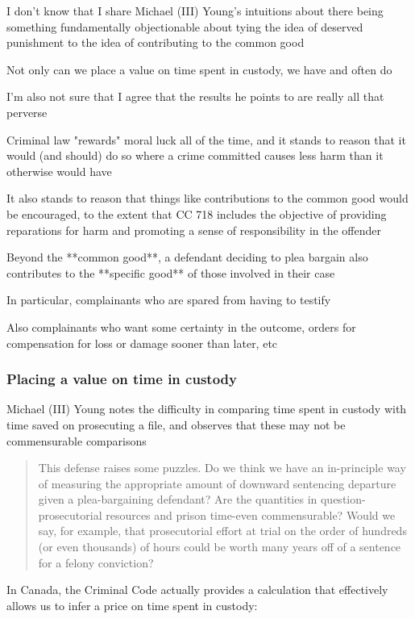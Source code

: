I don't know that I share Michael (III) Young's intuitions about there being something fundamentally objectionable about tying the idea of deserved punishment to the idea of contributing to the common good

Not only can we place a value on time spent in custody, we have and often do

I'm also not sure that I agree that the results he points to are really all that perverse

Criminal law "rewards" moral luck all of the time, and it stands to reason that it would (and should) do so where a crime committed causes less harm than it otherwise would have

It also stands to reason that things like contributions to the common good would be encouraged, to the extent that CC 718 includes the objective of providing reparations for harm and promoting a sense of responsibility in the offender

Beyond the **common good**, a defendant deciding to plea bargain also contributes to the **specific good** of those involved in their case

In particular, complainants who are spared from having to testify

Also complainants who want some certainty in the outcome, orders for compensation for loss or damage sooner than later, etc

\subsubsection{Placing a value on time in custody}

Michael (III) Young notes the difficulty in comparing time spent in custody with time saved on prosecuting a file, and observes that these may not be commensurable comparisons

\begin{quote}
    This defense raises some puzzles. Do we think we have an in-principle way of measuring the appropriate amount of downward sentencing departure given a plea-bargaining defendant? Are the quantities in question-prosecutorial resources and prison time-even commensurable? Would we say, for example, that prosecutorial effort at trial on the order of hundreds (or even thousands) of hours could be worth many years off of a sentence for a felony conviction?
\end{quote}

In Canada, the Criminal Code actually provides a calculation that effectively allows us to infer a price on time spent in custody:

